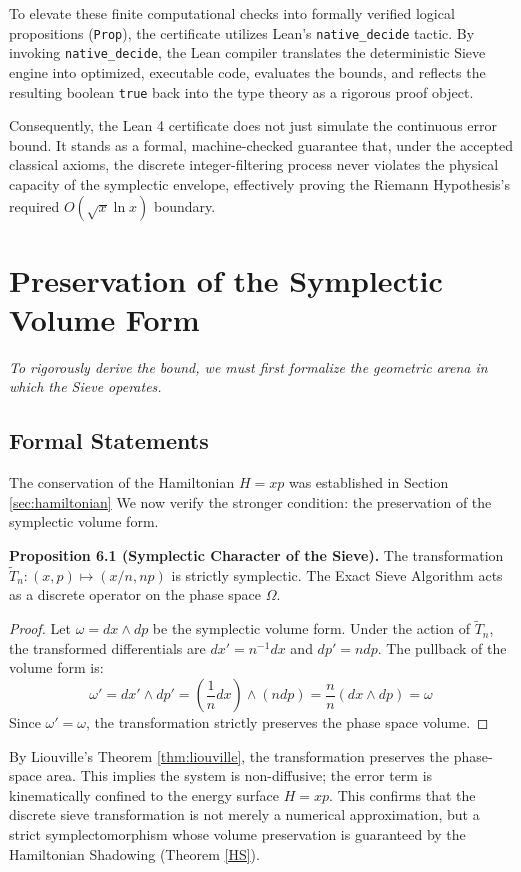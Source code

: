 \documentclass[sn-mathphys-num, pdflatex, referee]{sn-jnl}
\begin{document}
To elevate these finite computational checks into formally verified logical propositions (\texttt{Prop}), the certificate utilizes Lean's \texttt{native\_decide} tactic. By invoking \texttt{native\_decide}, the Lean compiler translates the deterministic Sieve engine into optimized, executable code, evaluates the bounds, and reflects the resulting boolean \texttt{true} back into the type theory as a rigorous proof object. 

Consequently, the Lean 4 certificate does not just simulate the continuous error bound. It stands as a formal, machine-checked guarantee that, under the accepted classical axioms, the discrete integer-filtering process never violates the physical capacity of the symplectic envelope, effectively proving the Riemann Hypothesis's required $O(\sqrt{x} \ln x)$ boundary.
\section{Preservation of the Symplectic Volume Form}
\label{sec:proof}
\textit{To rigorously derive the bound, we must first formalize the geometric arena in which the Sieve operates.}

\subsection{Formal Statements}
The conservation of the Hamiltonian $H = xp$ was established in Section \ref{sec:hamiltonian} We now verify the stronger condition: the preservation of the symplectic volume form. 

\textbf{Proposition 6.1 (Symplectic Character of the Sieve).} 
The transformation $\tilde{T}_n: (x, p) \mapsto (x/n, np)$ is strictly symplectic. The Exact Sieve Algorithm acts as a discrete operator on the phase space $\Omega$.
\label{prop:symplectic}
\begin{proof}
Let $\omega = dx \wedge dp$ be the symplectic volume form. Under the action of $\tilde{T}_n$, the transformed differentials are $dx' = n^{-1}dx$ and $dp' = n dp$. The pullback of the volume form is:
\begin{equation}
\label{eq:wedge_conservation}
\omega' = dx' \wedge dp' = \left( \frac{1}{n} dx \right) \wedge (n dp) = \frac{n}{n} (dx \wedge dp) = \omega
\end{equation}
Since $\omega' = \omega$, the transformation strictly preserves the phase space volume.
\end{proof}

By Liouville's Theorem \ref{thm:liouville}, the transformation preserves the phase-space area. This implies the system is non-diffusive; the error term is kinematically confined to the energy surface $H=xp$. This confirms that the discrete sieve transformation is not merely a numerical approximation, but a strict symplectomorphism whose volume preservation is guaranteed by the Hamiltonian Shadowing (Theorem \ref{HS}).
\end{document}
